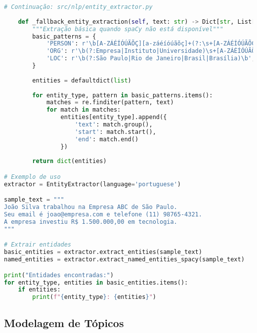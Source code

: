 \begin{pythonbox}
\begin{lstlisting}[language=Python]
# Continuação: src/nlp/entity_extractor.py
    
    def _fallback_entity_extraction(self, text: str) -> Dict[str, List[Dict]]:
        """Extração básica quando spaCy não está disponível"""
        basic_patterns = {
            'PERSON': r'\b[A-ZÁÉÍÓÚÃÕÇ][a-záéíóúãõç]+(?:\s+[A-ZÁÉÍÓÚÃÕÇ][a-záéíóúãõç]+)+\b',
            'ORG': r'\b(?:Empresa|Instituto|Universidade)\s+[A-ZÁÉÍÓÚÃÕÇ][a-záéíóúãõç\s]+\b',
            'LOC': r'\b(?:São Paulo|Rio de Janeiro|Brasil|Brasília)\b',
        }
        
        entities = defaultdict(list)
        
        for entity_type, pattern in basic_patterns.items():
            matches = re.finditer(pattern, text)
            for match in matches:
                entities[entity_type].append({
                    'text': match.group(),
                    'start': match.start(),
                    'end': match.end()
                })
                
        return dict(entities)

# Exemplo de uso
extractor = EntityExtractor(language='portuguese')

sample_text = """
João Silva trabalhou na Empresa ABC de São Paulo.
Seu email é joao@empresa.com e telefone (11) 98765-4321.
A empresa investiu R$ 1.500.000,00 em tecnologia.
"""

# Extrair entidades
basic_entities = extractor.extract_entities(sample_text)
named_entities = extractor.extract_named_entities_spacy(sample_text)

print("Entidades encontradas:")
for entity_type, entities in basic_entities.items():
    if entities:
        print(f"{entity_type}: {entities}")
\end{lstlisting}
\end{pythonbox}

\subsection{Modelagem de Tópicos}

